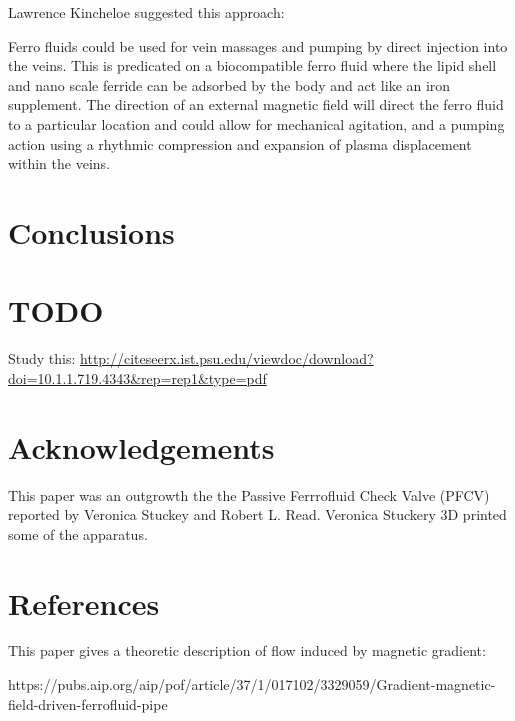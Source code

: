 \documentclass[12pt]{article}
\begin{document}
Lawrence Kincheloe suggested this approach:

Ferro fluids could be used for vein massages and pumping by direct injection into the veins. This is predicated on a biocompatible ferro fluid where the lipid shell and nano scale ferride can be adsorbed by the body and act like an iron supplement. The direction of an external magnetic field will direct the ferro fluid to a particular location and could allow for mechanical agitation, and a pumping action using a rhythmic compression and expansion of plasma displacement within the veins.

\section{Conclusions}

\section{TODO}

Study this: \url{http://citeseerx.ist.psu.edu/viewdoc/download?doi=10.1.1.719.4343&rep=rep1&type=pdf}

\section{Acknowledgements}

This paper was an outgrowth the the Passive Ferrrofluid Check Valve (PFCV) \cite{stuckeynovel}
reported by Veronica Stuckey and Robert L. Read. Veronica Stuckery 3D printed
some of the apparatus.

\section*{References}

This paper gives a theoretic description of flow induced by magnetic gradient:

https://pubs.aip.org/aip/pof/article/37/1/017102/3329059/Gradient-magnetic-field-driven-ferrofluid-pipe




\end{document}
